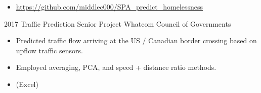 \documentclass[11pt]{developercv} %
\newcommand{\vsp}{\vspace{-10pt}}
\begin{document}
\begin{entrylist}
{\begin{itemize}
			\item \url{https://github.com/middlec000/SPA_predict_homelessness}
		\end{itemize}}
	\entry
		{2017}
		{Traffic Prediction Senior Project}
		{Whatcom Council of Governments}
		{\vspace{-0.5cm}\begin{itemize}
			\item Predicted traffic flow arriving at the US / Canadian border crossing based on upflow traffic sensors.
			\item Employed averaging, PCA, and speed + distance ratio methods.
			\item (Excel)
		\end{itemize}}
\end{entrylist}
\vsp

\end{document}
